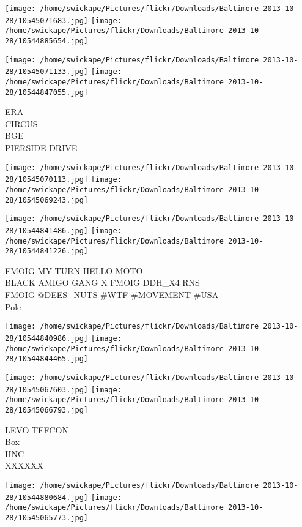 \documentclass[10pt,letterpaper]{article}
\begin{document}
\texttt{[image: /home/swickape/Pictures/flickr/Downloads/Baltimore 2013-10-28/10545071683.jpg]}
\texttt{[image: /home/swickape/Pictures/flickr/Downloads/Baltimore 2013-10-28/10544885654.jpg]}

\texttt{[image: /home/swickape/Pictures/flickr/Downloads/Baltimore 2013-10-28/10545071133.jpg]}
\texttt{[image: /home/swickape/Pictures/flickr/Downloads/Baltimore 2013-10-28/10544847055.jpg]}

ERA\\
CIRCUS\\
BGE\\
PIERSIDE DRIVE\\
\pagebreak

\texttt{[image: /home/swickape/Pictures/flickr/Downloads/Baltimore 2013-10-28/10545070113.jpg]}
\texttt{[image: /home/swickape/Pictures/flickr/Downloads/Baltimore 2013-10-28/10545069243.jpg]}

\texttt{[image: /home/swickape/Pictures/flickr/Downloads/Baltimore 2013-10-28/10544841486.jpg]}
\texttt{[image: /home/swickape/Pictures/flickr/Downloads/Baltimore 2013-10-28/10544841226.jpg]}

FMOIG MY TURN HELLO MOTO\\
BLACK AMIGO GANG X FMOIG DDH\_X4 RNS\\
FMOIG @DEES\_NUTS \#WTF \#MOVEMENT \#USA\\
Pole\\
\pagebreak

\texttt{[image: /home/swickape/Pictures/flickr/Downloads/Baltimore 2013-10-28/10544840986.jpg]}
\texttt{[image: /home/swickape/Pictures/flickr/Downloads/Baltimore 2013-10-28/10544844465.jpg]}

\texttt{[image: /home/swickape/Pictures/flickr/Downloads/Baltimore 2013-10-28/10545067603.jpg]}
\texttt{[image: /home/swickape/Pictures/flickr/Downloads/Baltimore 2013-10-28/10545066793.jpg]}

LEVO TEFCON\\
Box\\
HNC\\
XXXXXX\\
\pagebreak

\texttt{[image: /home/swickape/Pictures/flickr/Downloads/Baltimore 2013-10-28/10544880684.jpg]}
\texttt{[image: /home/swickape/Pictures/flickr/Downloads/Baltimore 2013-10-28/10545065773.jpg]}
\end{document}
